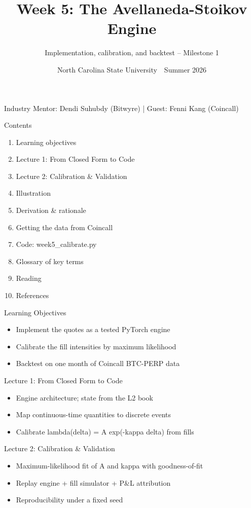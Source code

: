 \documentclass[aspectratio=169,10pt]{beamer}
\title{Week 5: The Avellaneda-Stoikov Engine}
\subtitle{Implementation, calibration, and backtest -- Milestone 1}
\date{North Carolina State University \,\textbar\, Summer 2026}
\begin{document}
\begin{frame}[plain]\titlepage\begin{center}\tiny Industry Mentor: Dendi Suhubdy (Bitwyre)  |  Guest: Fenni Kang (Coincall)\end{center}\end{frame}
\begin{frame}{Contents}
\small\begin{enumerate}\setlength{\itemsep}{3pt}
  \item Learning objectives
  \item Lecture 1: From Closed Form to Code
  \item Lecture 2: Calibration \& Validation
  \item Illustration
  \item Derivation \& rationale
  \item Getting the data from Coincall
  \item Code: week5\_calibrate.py
  \item Glossary of key terms
  \item Reading
  \item References
\end{enumerate}
\end{frame}

\begin{frame}{Learning Objectives}
\begin{itemize}
  \item Implement the quotes as a tested PyTorch engine
  \item Calibrate the fill intensities by maximum likelihood
  \item Backtest on one month of Coincall BTC-PERP data
\end{itemize}
\end{frame}

\begin{frame}{Lecture 1: From Closed Form to Code}
\begin{itemize}
  \item Engine architecture; state from the L2 book
  \item Map continuous-time quantities to discrete events
  \item Calibrate lambda(delta) = A exp(-kappa delta) from fills
\end{itemize}
\end{frame}

\begin{frame}{Lecture 2: Calibration \& Validation}
\begin{itemize}
  \item Maximum-likelihood fit of A and kappa with goodness-of-fit
  \item Replay engine + fill simulator + P\&L attribution
  \item Reproducibility under a fixed seed
\end{itemize}
\end{frame}
\end{document}
